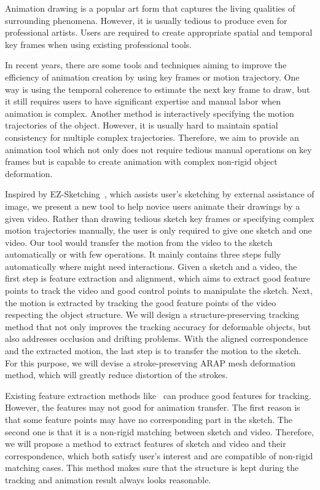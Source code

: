 Animation drawing is a popular art form that captures the living qualities of surrounding phenomena. However, it is usually tedious to produce even for professional artists. Users are required to create appropriate spatial and temporal key frames when using existing professional tools. 

In recent years, there are some tools and techniques aiming to improve the efficiency of animation creation by using key frames or motion trajectory. One way is using the temporal coherence to estimate the next key frame to draw, but it still requires users to have significant expertise and manual labor when animation is complex. Another method is interactively specifying the motion trajectories of the object. However, it is usually hard to maintain spatial consistency for multiple complex trajectories. Therefore, we aim to provide an animation tool which not only does not require tedious manual operations on key frames but is capable to create animation with complex non-rigid object deformation.

Inspired by EZ-Sketching~\cite{EZSketching:2014}, which assists user's sketching by external assistance of image, we present a new tool to help novice users animate their drawings by a given video. Rather than drawing tedious sketch key frames or specifying complex motion trajectories manually, the user is only required to give one sketch and one video. Our tool would transfer the motion from the video to the sketch automatically or with few operations. It mainly contains three steps fully automatically {where might need interactions}. 
Given a sketch and a video, the first step is feature extraction and alignment, which aims to extract good feature points to track the video and good control points to manipulate the sketch. 
Next, the motion is extracted by tracking the good feature points of the video respecting the object structure.
We will design a structure-preserving tracking method that not only improves the tracking accuracy for deformable objects, but also addresses occlusion and drifting problems.
With the aligned correspondence and the extracted motion, the last step is to transfer the motion to the sketch.
For this purpose, we will devise a stroke-preserving ARAP mesh deformation method, which will greatly reduce distortion of the strokes.

Existing feature extraction methods like~\cite{Shi:1994} can produce good features for tracking. However, the features may not good for animation transfer. The first reason is that some feature points may have no corresponding part in the sketch. The second one is that it is a non-rigid matching between sketch and video. Therefore, we will propose a method to extract features of sketch and video and their correspondence, which both satisfy user's interest and are compatible of non-rigid matching cases. This method makes sure that the structure is kept during the tracking and animation result always looks reasonable.

